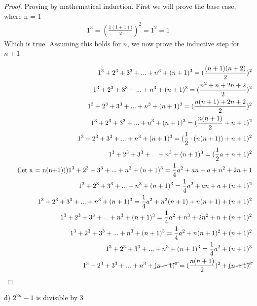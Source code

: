 \documentclass[]{report}
\begin{document}
\begin{proof}
	Proving by mathematical induction.
	First we will prove the base case, where n = 1\\
	\begin{align*}
	1^3 = (\frac{1(1+1))}{2})^2 = 1^2 = 1
	\end{align*}
	Which is true. Assuming this holds for $n$, we now prove the inductive step for $n+1$
	
	\begin{align*}
		1^3 + 2^3 + 3^3 + ... + n^3 + (n+1)^3 = (\frac{(n+1)(n+2)}{2})^2\\
		1^3 + 2^3 + 3^3 + ... + n^3 + (n+1)^3 = (\frac{n^2 + n  + 2n + 2}{2})^2\\
		1^3 + 2^3 + 3^3 + ... + n^3 + (n+1)^3 = (\frac{n(n+1) + 2n + 2}{2})^2 \\
		1^3 + 2^3 + 3^3 + ... + n^3 + (n+1)^3 = (\frac{n(n+1)}{2} + n+1)^2 \\
		1^3 + 2^3 + 3^3 + ... + n^3 + (n+1)^3 = (\frac{1}{2}\cdot(n(n+1)) + n+1)^2\\
		1^3 + 2^3 + 3^3 + ... + n^3 + (n+1)^3 = (\frac{1}{2}a + n+1)^2\\ \tag{let a = n(n+1))}
		1^3 + 2^3 + 3^3 + ... + n^3 + (n+1)^3 = \frac{1}{4}a^2 + an +  a + n^2 + 2n + 1\\
		1^3 + 2^3 + 3^3 + ... + n^3 + (n+1)^3 = \frac{1}{4}a^2 + an +  a + (n+1)^2\\
		1^3 + 2^3 + 3^3 + ... + n^3 + (n+1)^3 = \frac{1}{4}a^2 + n^2(n+1) + n(n+1) + (n+1)^2\\
		1^3 + 2^3 + 3^3 + ... + n^3 + (n+1)^3 = \frac{1}{4}a^2 + n^3 + 2n^2 + n + (n+1)^2\\
		1^3 + 2^3 + 3^3 + ... + n^3 + (n+1)^3 = \frac{1}{4}a^2 + n(n+1)^2 + (n+1)^2 \\
		1^3 + 2^3 + 3^3 + ... + n^3 + (n+1)^3 = \frac{1}{4}a^2  + (n+1)^3 \\
		1^3 + 2^3 + 3^3 + ... + n^3 + \cancel{(n+1)^3} = (\frac{n(n+1)}{2})^2 + \cancel{(n+1)^3} \\
	\end{align*}
\end{proof}

d) $2^{2n} - 1$ is divisible by 3
\end{document}
